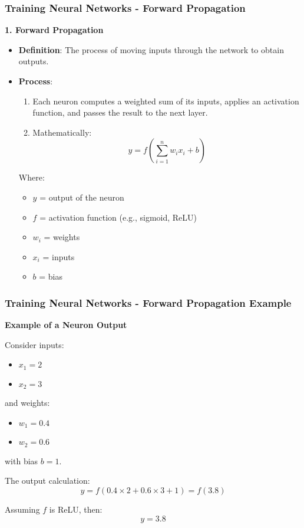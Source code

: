 \documentclass[aspectratio=169]{beamer}
\begin{document}
\begin{frame}[fragile]
  \frametitle{Training Neural Networks - Forward Propagation}
  \textbf{1. Forward Propagation}
  
  \begin{itemize}
    \item \textbf{Definition}: The process of moving inputs through the network to obtain outputs.
    \item \textbf{Process}:
      \begin{enumerate}
        \item Each neuron computes a weighted sum of its inputs, applies an activation function, and passes the result to the next layer.
        \item Mathematically:
        \begin{equation}
        y = f\left(\sum_{i=1}^{n} w_i x_i + b\right) 
        \end{equation}
        \end{enumerate}
    Where:
    \begin{itemize}
      \item \( y \) = output of the neuron
      \item \( f \) = activation function (e.g., sigmoid, ReLU)
      \item \( w_i \) = weights
      \item \( x_i \) = inputs
      \item \( b \) = bias
    \end{itemize}
  \end{itemize}
\end{frame}

\begin{frame}[fragile]
  \frametitle{Training Neural Networks - Forward Propagation Example}
  \textbf{Example of a Neuron Output}
  
  Consider inputs:
  \begin{itemize}
    \item \( x_1 = 2 \)
    \item \( x_2 = 3 \)
  \end{itemize}
  and weights:
  \begin{itemize}
    \item \( w_1 = 0.4 \)
    \item \( w_2 = 0.6 \)
  \end{itemize}
  with bias \( b = 1 \).

  The output calculation:
  \begin{equation}
  y = f(0.4 \times 2 + 0.6 \times 3 + 1) = f(3.8)
  \end{equation}
  
  Assuming \( f \) is ReLU, then:
  \[
  y = 3.8
  \]
\end{frame}
\end{document}
